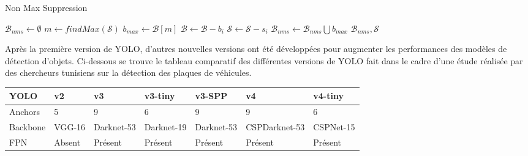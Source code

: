\begin{itemize}
            \begin{algorithm}[H]
                \caption{Non Max Suppression}
                \begin{algorithmic}[1]
                 
                    \State $\mathcal{B}_{nms} \leftarrow \emptyset$
                        \State $m \leftarrow findMax(\mathcal{S})$  
                        \State $b_{max} \leftarrow \mathcal{B}[m]$
                                \State $\mathcal{B} \leftarrow \mathcal{B} - b_i$
                                \State $\mathcal{S} \leftarrow \mathcal{S} - s_i$
                            \EndIf
                        \EndFor
                        \State $\mathcal{B}_{nms} \leftarrow \mathcal{B}_{nms} \bigcup b_{max}$
                    \EndWhile 
                    \State \Return $\mathcal{B}_{nms}, \mathcal{S}$
                \EndFunction
                \end{algorithmic}
            \end{algorithm}
            Après la première version de YOLO, d’autres nouvelles versions ont été développées pour augmenter les performances des modèles de détection d’objets. Ci-dessous se trouve le tableau comparatif des différentes versions de YOLO fait dans le cadre d’une étude réalisée par des chercheurs tunisiens sur la détection des plaques de véhicules.
            \begin{table}[H]
                \centering
                \begin{tabular}{|l|l|l|l|l|l|l|}
                    \hline
                    \rowcolor{Gray}
                    \textbf{YOLO} & \textbf{v2} & \textbf{v3} & \textbf{v3-tiny} & \textbf{v3-SPP} & \textbf{v4} & \textbf{v4-tiny} \\ \hline
                    Anchors  & 5 & 9 & 6 & 9 & 9 & 6 \\ \hline
                    Backbone & VGG-16 & Darknet-53 & Darknet-19 & Darknet-53 & CSPDarknet-53 & CSPNet-15 \\ \hline
                    FPN & Absent & Présent & Présent & Présent & Présent & Présent \\ \hline

\end{tabular}
\end{table}
\end{itemize}
